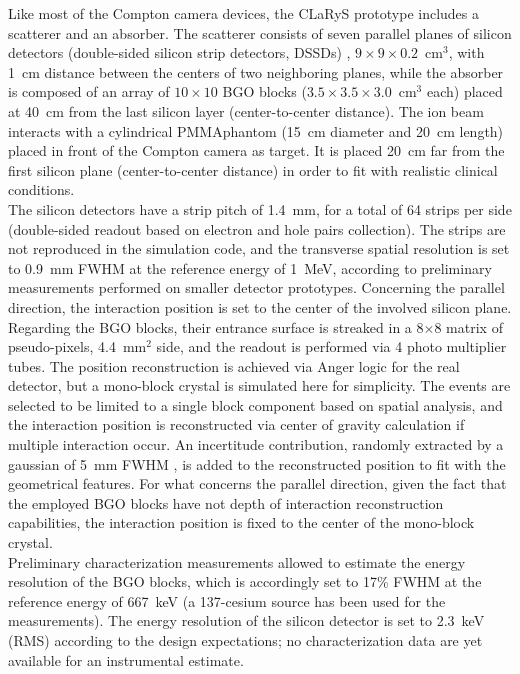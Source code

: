 Like most of the Compton camera devices, the CLaRyS prototype includes a scatterer and an absorber. The scatterer consists of seven parallel planes of silicon detectors (double-sided silicon strip detectors, DSSDs) , $9\times9\times0.2$~cm$^3$, with 1~cm distance between the centers of two neighboring planes, while the absorber is composed of an array of $10\times10$ BGO blocks ($3.5\times3.5\times3.0$~cm$^3$ each) placed at 40~cm from the last silicon layer (center-to-center distance). The ion beam interacts with a cylindrical PMMA\footnotemark[1] phantom (15~cm diameter and 20~cm length) placed in front of the Compton camera as target. It is placed 20~cm far from the first silicon plane (center-to-center distance) in order to fit with realistic clinical conditions.\\
The silicon detectors have a strip pitch of 1.4~mm, for a total of 64 strips per side (double-sided readout based on electron and hole pairs collection). The strips are not reproduced in the simulation code, and the transverse spatial resolution is set to 0.9~mm FWHM at the reference energy of 1~MeV, according to preliminary measurements performed on smaller detector prototypes. Concerning the parallel direction, the interaction position is set to the center of the involved silicon plane.\\
Regarding the BGO blocks, their entrance surface is streaked in a 8$\times$8 matrix of pseudo-pixels, 4.4~mm$^{2}$ side, and the readout is performed via 4 photo multiplier tubes. The position reconstruction is achieved via Anger logic for the real detector, but a mono-block crystal is simulated here for simplicity. The events are selected to be limited to a single block component based on spatial analysis, and the interaction position is reconstructed via center of gravity calculation if multiple interaction occur. An incertitude contribution, randomly extracted by a gaussian of 5~mm FWHM , is added to the reconstructed position to fit with the geometrical features. For what concerns the parallel direction, given the fact that the employed BGO blocks have not depth of interaction reconstruction capabilities, the interaction position is fixed to the center of the mono-block crystal.\\
Preliminary characterization measurements allowed to estimate the energy resolution of the BGO blocks, which is accordingly set to 17\% FWHM at the reference energy of 667~keV (a 137-cesium source has been used for the measurements). The energy resolution of the silicon detector is set to 2.3~keV (RMS) according to the design expectations; no characterization data are yet available for an instrumental estimate.\\

